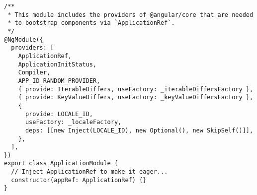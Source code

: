 \begin{verbatim}
/**
 * This module includes the providers of @angular/core that are needed
 * to bootstrap components via `ApplicationRef`.
 */
@NgModule({
  providers: [
    ApplicationRef,
    ApplicationInitStatus,
    Compiler,
    APP_ID_RANDOM_PROVIDER,
    { provide: IterableDiffers, useFactory: _iterableDiffersFactory },
    { provide: KeyValueDiffers, useFactory: _keyValueDiffersFactory },
    {
      provide: LOCALE_ID,
      useFactory: _localeFactory,
      deps: [[new Inject(LOCALE_ID), new Optional(), new SkipSelf()]],
    },
  ],
})
export class ApplicationModule {
  // Inject ApplicationRef to make it eager...
  constructor(appRef: ApplicationRef) {}
}
\end{verbatim}
